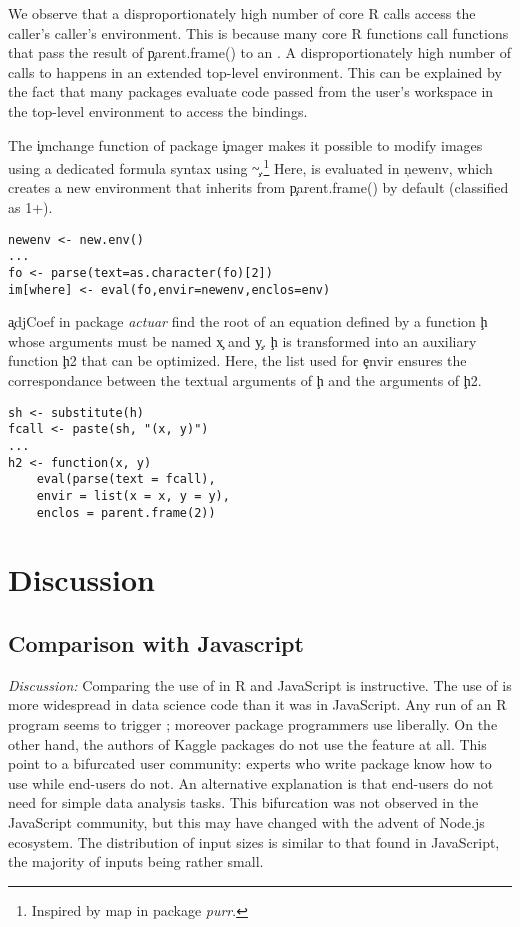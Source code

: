 \documentclass[USenglish,cleveref, autoref, thm-restate]{lipics-v2019}
\begin{document}
We observe that a disproportionately high number of core R \eval calls
access the caller's caller's environment. This is because many core R
functions call functions that pass the result of \c{parent.frame()} to an
\eval.  A disproportionately high number of calls to \eval happens in an
extended top-level environment. This can be explained by the fact that many
packages evaluate code passed from the user's workspace in the top-level
environment to access the bindings.


The \c{imchange} function of package \c{imager} makes it possible to modify
images using a dedicated formula syntax using \c{\~}.\footnote{Inspired by
 {map} in package \emph{purr}.}  Here, \eval is evaluated in \c{newenv},
which creates a new environment that inherits from \c{parent.frame()} by
default (classified as 1+).


\begin{lstlisting}
newenv <- new.env()
...
fo <- parse(text=as.character(fo)[2])
im[where] <- eval(fo,envir=newenv,enclos=env)
\end{lstlisting}

\c{adjCoef} in package \emph{actuar} find the root of an equation defined by
a function \c{h} whose arguments must be named \c{x} and \c{y}.  \c{h} is
transformed into an auxiliary function \c{h2} that can be optimized. Here,
the list used for \c{envir} ensures the correspondance between the textual
arguments of \c{h} and the arguments of \c{h2}.


\begin{lstlisting}
sh <- substitute(h)
fcall <- paste(sh, "(x, y)")
...
h2 <- function(x, y)
    eval(parse(text = fcall),
    envir = list(x = x, y = y),
    enclos = parent.frame(2))
\end{lstlisting}

\section{Discussion}

\subsection{Comparison with Javascript}

\medskip\noindent\emph{Discussion:} Comparing the use of \eval in R and
JavaScript is instructive. The use of \eval is more widespread in data
science code than it was in JavaScript. Any run of an R program seems to
trigger \eval; moreover package programmers use \eval liberally. On the
other hand, the authors of Kaggle packages do not use the feature at all.
This point to a bifurcated user community: experts who write package know
how to use \eval while end-users do not. An alternative explanation is that
end-users do not need \eval for simple data analysis tasks. This bifurcation
was not observed in the JavaScript community, but this may have changed with
the advent of Node.js ecosystem.  The distribution of input sizes is similar
to that found in JavaScript, the majority of inputs being rather small.
\end{document}
